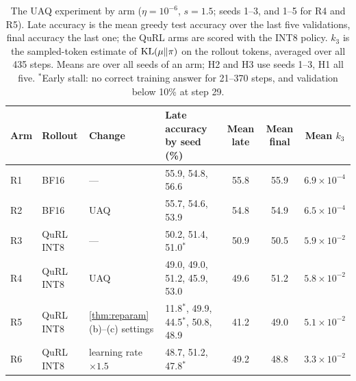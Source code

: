 \begin{table}[t]
\centering\footnotesize
\begin{tabularx}{\linewidth}{@{}l l l L c c c@{}}
\toprule
Arm & Rollout & Change & Late accuracy by seed (\%) & Mean late & Mean final & Mean $k_3$\\
\midrule
R1 & BF16 & --- & 55.9, 54.8, 56.6 & 55.8 & 55.9 & $6.9\times10^{-4}$\\
R2 & BF16 & UAQ & 55.7, 54.6, 53.9 & 54.8 & 54.9 & $6.5\times10^{-4}$\\
\midrule
R3 & QuRL INT8 & --- & 50.2, 51.4, 51.0$^*$ & 50.9 & 50.5 & $5.9\times10^{-2}$\\
R4 & QuRL INT8 & UAQ & 49.0, 49.0, 51.2, 45.9, 53.0 & 49.6 & 51.2 & $5.8\times10^{-2}$\\
R5 & QuRL INT8 & \cref{thm:reparam}(b)--(c) settings & 11.8$^*$, 49.9, 44.5$^*$, 50.8, 48.9 & 41.2 & 49.0 & $5.1\times10^{-2}$\\
R6 & QuRL INT8 & learning rate $\times1.5$ & 48.7, 51.2, 47.8$^*$ & 49.2 & 48.8 & $3.3\times10^{-2}$\\
\bottomrule
\end{tabularx}
\caption{The UAQ experiment by arm ($\eta=10^{-6}$, $s=1.5$; seeds 1--3, and 1--5 for R4 and R5). Late accuracy is the mean greedy test accuracy over the last five validations, final accuracy the last one; the QuRL arms are scored with the INT8 policy. $k_3$ is the sampled-token estimate of $\KL(\mu\|\pi)$ on the rollout tokens, averaged over all 435 steps. Means are over all seeds of an arm; H2 and H3 use seeds 1--3, H1 all five. $^*$Early stall: no correct training answer for 21--370 steps, and validation below 10\% at step 29.}\label{tab:s3arms}
\end{table}

